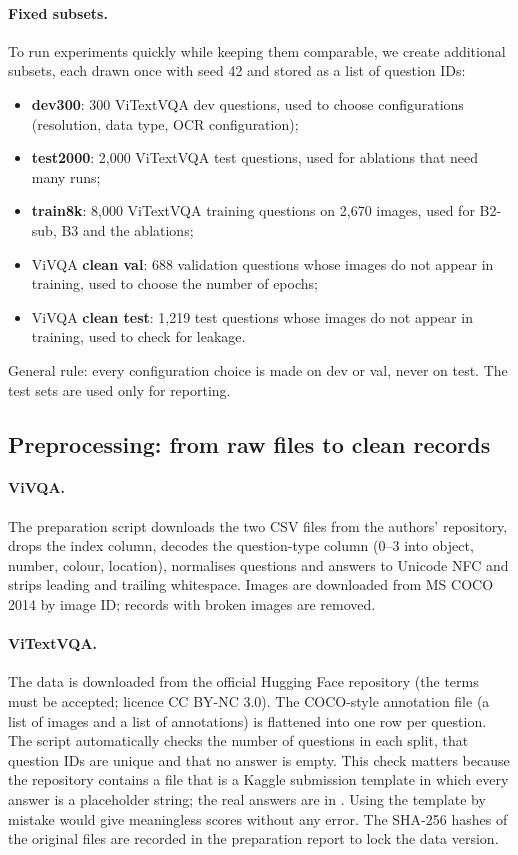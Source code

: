 \paragraph{Fixed subsets.} To run experiments quickly while keeping them comparable, we create additional subsets, each drawn once with seed 42 and stored as a list of
question IDs:
\begin{itemize}
  \item \textbf{dev300}: 300 ViTextVQA dev questions, used to choose configurations
  (resolution, data type, OCR configuration);
  \item \textbf{test2000}: 2,000 ViTextVQA test questions, used for ablations that need
  many runs;
  \item \textbf{train8k}: 8,000 ViTextVQA training questions on 2,670 images, used for
  B2-sub, B3 and the ablations;
  \item ViVQA \textbf{clean val}: 688 validation questions whose images do not appear in
  training, used to choose the number of epochs;
  \item ViVQA \textbf{clean test}: 1,219 test questions whose images do not appear in
  training, used to check for leakage.
\end{itemize}

General rule: every configuration choice is made on dev or val, never on test. The test
sets are used only for reporting.

\subsection{Preprocessing: from raw files to clean records}
\label{sec:met-prep}

\paragraph{ViVQA.} The preparation script downloads the two CSV files from the authors'
repository, drops the index column, decodes the question-type column (0--3 into object,
number, colour, location), normalises questions and answers to Unicode NFC and strips
leading and trailing whitespace. Images are downloaded from MS COCO 2014 by image ID;
records with broken images are removed.

\paragraph{ViTextVQA.} The data is downloaded from the official Hugging Face repository
(the terms must be accepted; licence CC BY-NC 3.0). The COCO-style annotation file (a
list of images and a list of annotations) is flattened into one row per question. The
script automatically checks the number of questions in each split, that question IDs
are unique and that no answer is empty. This check matters because the repository
contains a file  that is a Kaggle submission template in which
every answer is a placeholder string; the real answers are in
. Using the template by mistake would give meaningless
scores without any error. The SHA-256 hashes of the original files are recorded in the
preparation report to lock the data version.

